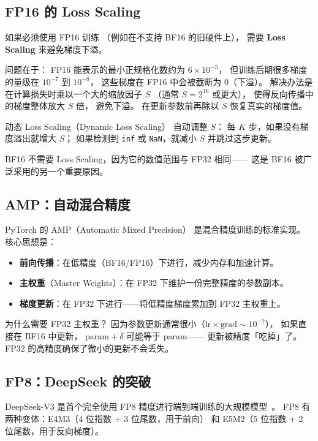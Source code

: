 \subsection{FP16 的 Loss Scaling}

如果必须使用 FP16 训练
（例如在不支持 BF16 的旧硬件上），
需要 \textbf{Loss Scaling} 来避免梯度下溢。

问题在于：
FP16 能表示的最小正规格化数约为 $6 \times 10^{-5}$，
但训练后期很多梯度的量级在 $10^{-7}$ 到 $10^{-8}$，
这些梯度在 FP16 中会被截断为 0（下溢）。
解决办法是在计算损失时乘以一个大的缩放因子 $S$
（通常 $S = 2^{16}$ 或更大），
使得反向传播中的梯度整体放大 $S$ 倍，
避免下溢。
在更新参数前再除以 $S$ 恢复真实的梯度值。

动态 Loss Scaling（Dynamic Loss Scaling）
自动调整 $S$：
每 $K$ 步，如果没有梯度溢出就增大 $S$；
如果检测到 \texttt{inf} 或 \texttt{NaN}，就减小 $S$ 并跳过这步更新。

BF16 不需要 Loss Scaling，因为它的数值范围与 FP32 相同——
这是 BF16 被广泛采用的另一个重要原因。

\subsection{AMP：自动混合精度}

PyTorch 的 AMP（Automatic Mixed Precision）
是混合精度训练的标准实现。
核心思想是：
\begin{itemize}[noitemsep]
  \item \textbf{前向传播}：在低精度（BF16/FP16）下进行，减少内存和加速计算。
  \item \textbf{主权重}（Master Weights）：在 FP32 下维护一份完整精度的参数副本。
  \item \textbf{梯度更新}：在 FP32 下进行——将低精度梯度累加到 FP32 主权重上。
\end{itemize}

为什么需要 FP32 主权重？
因为参数更新通常很小（$\mathrm{lr} \times \mathrm{grad} \sim 10^{-7}$），
如果直接在 BF16 中更新，
$\mathrm{param} + \delta$ 可能等于 $\mathrm{param}$——
更新被精度「吃掉」了。
FP32 的高精度确保了微小的更新不会丢失。

\subsection{FP8：DeepSeek 的突破}

DeepSeek-V3 是首个完全使用 FP8 精度进行端到端训练的大规模模型~\cite{deepseekv3}。
FP8 有两种变体：E4M3（4 位指数 + 3 位尾数，用于前向）
和 E5M2（5 位指数 + 2 位尾数，用于反向梯度）。

